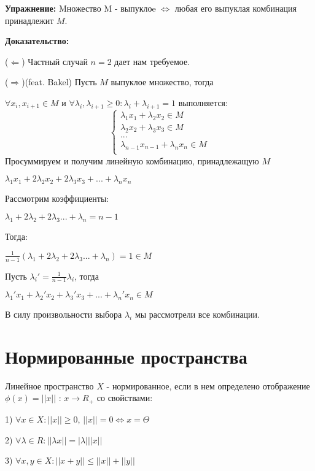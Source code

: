 \documentclass[12pt, english]{article}
\begin{document}
\textbf{Упражнение:}
	Mножество M - выпуклоe $\Leftrightarrow$ любая его выпуклая комбинация принадлежит $M$.
	
\textbf{Доказательство:}
	
	($\Leftarrow$) Частный случай $n = 2$ дает нам требуемое.
	
	($\Rightarrow$)(feat. Bakel) Пусть $M$ выпуклое множество, тогда
	
	$\forall x_i, x_{i+1}\in M$ и $\forall \lambda_i , \lambda_{i+1} \ge 0 : \lambda_i + \lambda_{i+1} = 1$ выполняется:	
$$
\begin{cases}
  	\lambda_1 x_1 + \lambda_2 x_2 \in M \\
    \lambda_2 x_2 + \lambda_3 x_3 \in M \\ 
    ... \\
    \lambda_{n-1} x_{n-1} + \lambda_n x_n \in M \\ 
\end{cases}
$$	
Просуммируем и получим линейную комбинацию, принадлежащую $M$
	
	$\lambda_1 x_1 + 2\lambda_2 x_2 + 2\lambda_3 x_3 + ... + \lambda_n x_n$
	
	Рассмотрим коэффициенты:
	
	$\lambda_1  + 2\lambda_2 + 2\lambda_3 ...+  \lambda_n = n - 1$
	
	Тогда:
	
	$\frac{1}{n-1}(\lambda_1  + 2\lambda_2 + 2\lambda_3 ...+  \lambda_n) = 1 \in M$
	
	Пусть $\lambda_i' = \frac{1}{n-1}\lambda_i$, тогда
	
	$\lambda_1' x_1  + \lambda_2' x_2 + \lambda_3' x_3 + ...+  \lambda_n' x_n \in M$ 
	
	В силу произвольности выбора $\lambda_i$ мы рассмотрели все комбинации.
	
	
	
	
	
	
	
	
\section{Нормированные пространства}
		Линейное пространство $X$ - нормированное, если в нем определено отображение $\phi(x) = ||x||$ : $ x \to R_+$ со свойствами:
		
		1) $\forall x \in X: ||x|| \ge 0$, $||x|| = 0 \Leftrightarrow x = \Theta$
		
		2) $\forall \lambda \in R:  || \lambda x || = |\lambda|||x||$
		
		3) $\forall x,y \in X : ||x + y || \leq ||x|| + ||y||$
	
\end{document}
